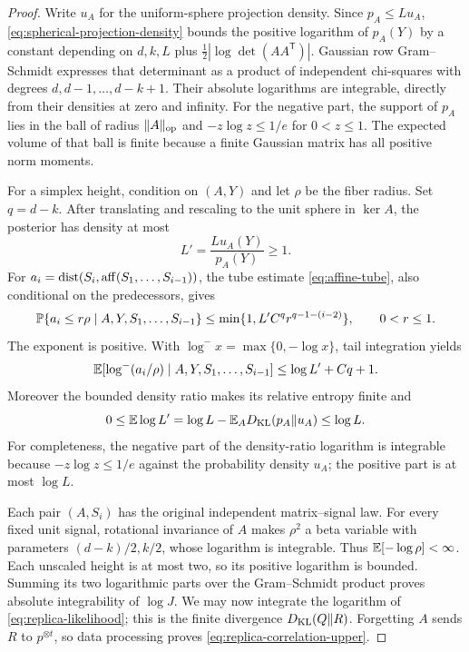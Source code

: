 \begin{proof}
Write $u_A$ for the uniform-sphere projection density. Since $p_A\le Lu_A$,
\eqref{eq:spherical-projection-density} bounds the positive logarithm of
$p_A(Y)$ by a constant depending on $d,k,L$ plus
$\tfrac12|\log\det(AA^{\mathsf T})|$. Gaussian row Gram--Schmidt expresses
that determinant as a product of independent chi-squares with degrees
$d,d-1,\ldots,d-k+1$. Their absolute logarithms are integrable, directly
from their densities at zero and infinity. For the negative part, the
support of $p_A$ lies in the ball of radius $\lVert A\rVert_{\mathrm{op}}$ and
$-z\log z\le1/e$ for $0<z\le1$. The expected volume of that ball is
finite because a finite Gaussian matrix has all positive norm moments.

For a simplex height, condition on $(A,Y)$ and let $\rho$ be the fiber
radius. Set $q=d-k$. After translating and rescaling to the unit sphere in
$\ker A$, the posterior has density at most
\[
 L' =\frac{L u_A(Y)}{p_A(Y)}\ge1.
\]
For $a_i=\operatorname{dist}(S_i,\operatorname{aff}(S_1,\ldots,S_{i-1}))$, the tube estimate
\eqref{eq:affine-tube}, also conditional on the predecessors, gives
\[
 \mathbb P\{a_i\le r\rho\mid A,Y,S_1,\ldots,S_{i-1}\}
 \le\min\{1,L'C^q r^{q-1-(i-2)}\},\qquad 0<r\le1.
\]
The exponent is positive. With $\log^-x=\max\{0,-\log x\}$, tail
integration yields
\[
 \mathbb E[\log^-(a_i/\rho)\mid A,Y,S_1,\ldots,S_{i-1}]
 \le\log L'+Cq+1.
\]
Moreover the bounded density ratio makes its relative entropy finite and
\begin{equation}\label{eq:posterior-tilt-budget}
 0\le\mathbb E\log L'=\log L-\mathbb E_AD_{\mathrm{KL}}(p_A\Vert u_A)\le\log L.
\end{equation}
For completeness, the negative part of the density-ratio logarithm is
integrable because $-z\log z\le1/e$ against the probability density $u_A$;
the positive part is at most $\log L$.

Each pair $(A,S_i)$ has the original independent matrix--signal law.
For every fixed unit signal, rotational invariance of $A$ makes $\rho^2$
a beta variable with parameters $(d-k)/2,k/2$, whose logarithm is integrable.
Thus $\mathbb E[-\log\rho]<\infty$. Each unscaled height is at most two, so its
positive logarithm is bounded. Summing its two logarithmic parts over the
Gram--Schmidt product proves absolute integrability of $\log J$.
We may now integrate the logarithm of \eqref{eq:replica-likelihood}; this is
the finite divergence $D_{\mathrm{KL}}(Q\Vert R)$. Forgetting $A$ sends $R$ to
$p^{\otimes t}$, so data processing proves
\eqref{eq:replica-correlation-upper}.
\end{proof}
